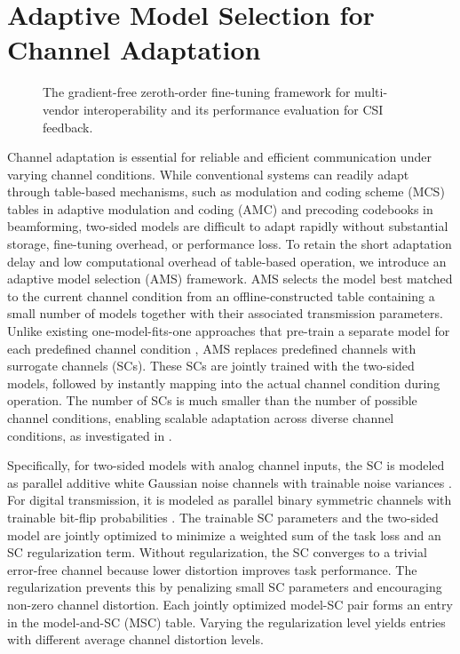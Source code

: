 \documentclass[10pt,twocolumn]{IEEEtran}
\begin{document}
\section{Adaptive Model Selection for Channel Adaptation}


\begin{figure}[t]
    \centering
    {}\vspace{-2mm}
    \caption{The gradient-free zeroth-order fine-tuning framework for multi-vendor interoperability and its performance evaluation for CSI feedback.}\label{fig:zoo}\vspace{-3mm}
\end{figure}




Channel adaptation is essential for reliable and efficient communication under varying channel conditions. While conventional systems can readily adapt through table-based mechanisms, such as modulation and coding scheme (MCS) tables in adaptive modulation and coding (AMC) and precoding codebooks in beamforming, two-sided models are difficult to adapt rapidly without substantial storage, fine-tuning overhead, or performance loss. To retain the short adaptation delay and low computational overhead of table-based operation, we introduce an adaptive model selection (AMS) framework. AMS selects the model best matched to the current channel condition from an offline-constructed table containing a small number of models together with their associated transmission parameters. Unlike existing one-model-fits-one approaches that pre-train a separate model for each predefined channel condition \cite{DeepJSCC_Q,10015684}, AMS replaces predefined channels with surrogate channels (SCs). These SCs are jointly trained with the two-sided models, followed by instantly mapping into the actual channel condition during operation. The number of SCs is much smaller than the number of possible channel conditions, enabling scalable adaptation across diverse channel conditions, as investigated in \cite{oh2026sfc,oh2025blindtraining}.

Specifically, for two-sided models with analog channel inputs, the SC is modeled as parallel additive white Gaussian noise channels with trainable noise variances \cite{oh2026sfc}. For digital transmission, it is modeled as parallel binary symmetric channels with trainable bit-flip probabilities \cite{oh2025blindtraining}. The trainable SC parameters and the two-sided model are jointly optimized to minimize a weighted sum of the task loss and an SC regularization term. Without 
regularization, the SC converges to a trivial error-free channel because lower distortion improves task performance. The regularization prevents this by penalizing small SC parameters and encouraging non-zero channel distortion. Each jointly optimized model-SC pair forms an entry in the model-and-SC (MSC) table. Varying the regularization level yields entries with different average channel distortion levels.
\end{document}

